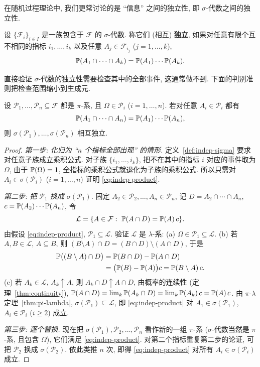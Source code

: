 在随机过程理论中, 我们更常讨论的是 ``信息'' 之间的独立性, 即 $\sigma$-代数之间的独立性.

\begin{definition}\label{def:indep-sigma}
设 $\{\mathcal{F}_i\}_{i\in I}$ 是一族包含于 $\mathcal{F}$ 的 $\sigma$-代数. 称它们 (相互) \textbf{独立}, 如果对任意有限个互不相同的指标 $i_1,\dots,i_k$ 以及任意 $A_j\in\mathcal{F}_{i_j}$ ($j=1,\dots,k$),
\[
\P(A_1\cap\cdots\cap A_k)=\P(A_1)\cdots\P(A_k).
\]
\end{definition}

直接验证 $\sigma$-代数的独立性需要检查其中的全部事件, 这通常做不到. 下面的判别准则把检查范围缩小到生成元.

\begin{theorem}\label{thm:indep-pi}
设 $\mathcal{P}_1,\dots,\mathcal{P}_n\subseteq\mathcal{F}$ 都是 $\pi$-系, 且 $\Omega\in\mathcal{P}_i$ ($i=1,\dots,n$). 若对任意 $A_i\in\mathcal{P}_i$ 都有
\begin{equation}\label{eq:indep-product}
\P(A_1\cap\cdots\cap A_n)=\P(A_1)\cdots\P(A_n),
\end{equation}
则 $\sigma(\mathcal{P}_1),\dots,\sigma(\mathcal{P}_n)$ 相互独立.
\end{theorem}

\begin{proof}
\emph{第一步: 化归为 ``$n$ 个指标全部出现'' 的情形.} 定义~\ref{def:indep-sigma} 要求对任意子族成立乘积公式. 对子族 $\{i_1,\dots,i_k\}$, 把不在其中的指标 $i$ 对应的事件取为 $\Omega$, 由于 $\P(\Omega)=1$, 全指标的乘积公式就退化为子族的乘积公式. 所以只需对 $A_i\in\sigma(\mathcal{P}_i)$ ($i=1,\dots,n$) 证明 \eqref{eq:indep-product}.

\emph{第二步: 把 $\mathcal{P}_1$ 换成 $\sigma(\mathcal{P}_1)$.} 固定 $A_2\in\mathcal{P}_2,\dots,A_n\in\mathcal{P}_n$, 记 $D=A_2\cap\cdots\cap A_n$, $c=\P(A_2)\cdots\P(A_n)$, 令
\[
\mathcal{L}=\{A\in\mathcal{F}:\ \P(A\cap D)=\P(A)\,c\}.
\]
由假设 \eqref{eq:indep-product}, $\mathcal{P}_1\subseteq\mathcal{L}$. 验证 $\mathcal{L}$ 是 $\lambda$-系:
(a) $\Omega\in\mathcal{P}_1\subseteq\mathcal{L}$.
(b) 若 $A,B\in\mathcal{L}$, $A\subseteq B$, 则 $(B\setminus A)\cap D=(B\cap D)\setminus(A\cap D)$, 于是
\begin{align*}
\P\big((B\setminus A)\cap D\big)&=\P(B\cap D)-\P(A\cap D)\\
&=\big(\P(B)-\P(A)\big)c=\P(B\setminus A)\,c.
\end{align*}
(c) 若 $A_k\in\mathcal{L}$, $A_k\uparrow A$, 则 $A_k\cap D\uparrow A\cap D$, 由概率的连续性 (定理~\ref{thm:continuity}),
$\P(A\cap D)=\lim_k\P(A_k\cap D)=\lim_k\P(A_k)\,c=\P(A)\,c$.
由 $\pi$-$\lambda$ 定理~\ref{thm:pi-lambda}, $\sigma(\mathcal{P}_1)\subseteq\mathcal{L}$, 即 \eqref{eq:indep-product} 对 $A_1\in\sigma(\mathcal{P}_1)$, $A_i\in\mathcal{P}_i$ ($i\ge2$) 成立.

\emph{第三步: 逐个替换.} 现在把 $\sigma(\mathcal{P}_1),\mathcal{P}_2,\dots,\mathcal{P}_n$ 看作新的一组 $\pi$-系 ($\sigma$-代数当然是 $\pi$-系, 且包含 $\Omega$), 它们满足 \eqref{eq:indep-product}. 对第二个指标重复第二步的论证, 可把 $\mathcal{P}_2$ 换成 $\sigma(\mathcal{P}_2)$. 依此类推 $n$ 次, 即得 \eqref{eq:indep-product} 对所有 $A_i\in\sigma(\mathcal{P}_i)$ 成立.
\end{proof}

